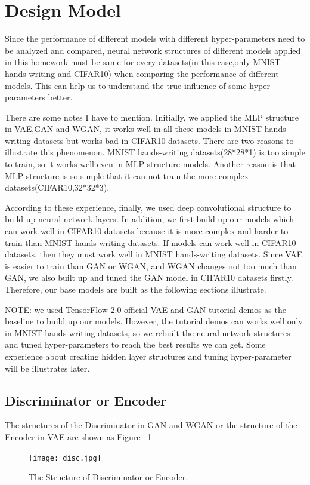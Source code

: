 \documentclass[12pt,letterpaper]{article}
\begin{document}
\section{Design Model}

Since the performance of different models with different hyper-parameters need to be analyzed and compared, neural network structures of different models applied in this homework must be same for every datasets(in this case,only MNIST hands-writing and CIFAR10) when comparing the performance of different models. This can help us to understand the true influence of some hyper-parameters better.

There are some notes I have to mention. Initially, we applied the MLP structure in VAE,GAN and WGAN, it works well in all these models in MNIST hands-writing datasets but works bad in CIFAR10 datasets. There are two reasons to illustrate this phenomenon. MNIST hands-writing datasets(28*28*1) is too simple to train, so it works well even in MLP structure models. Another reason is that MLP structure is so simple that it can not train the more complex datasets(CIFAR10,32*32*3). 

According to these experience, finally, we used deep convolutional structure to build up neural network layers. In addition, we first build up our models which can work well in CIFAR10 datasets because it is more complex and harder to train than MNIST hands-writing datasets. If models can work well in CIFAR10 datasets, then they must work well in MNIST hands-writing datasets. Since VAE is easier to train than GAN or WGAN, and WGAN changes not too much than GAN, we also built up and tuned the GAN model in CIFAR10 datasets firstly. Therefore, our base models are built as the following sections illustrate.

NOTE: we used TensorFlow 2.0 official VAE and GAN tutorial demos as the baseline to build up our models. However, the tutorial demos can works well only in MNIST hands-writing datasets, so we rebuilt the neural network structures and tuned hyper-parameters to reach the best results we can get. Some experience about creating hidden layer structures and tuning hyper-parameter will be illustrates later.

\subsection{Discriminator or Encoder}

The structures of the Discriminator in GAN and WGAN or the structure of the Encoder in VAE are shown as Figure ~\ref{fig:disc}
\begin{figure}[h]
    \centering
    \texttt{[image: disc.jpg]}
    \caption{\small The Structure of Discriminator or Encoder.}
    \label{fig:disc}
\end{figure}
\end{document}

